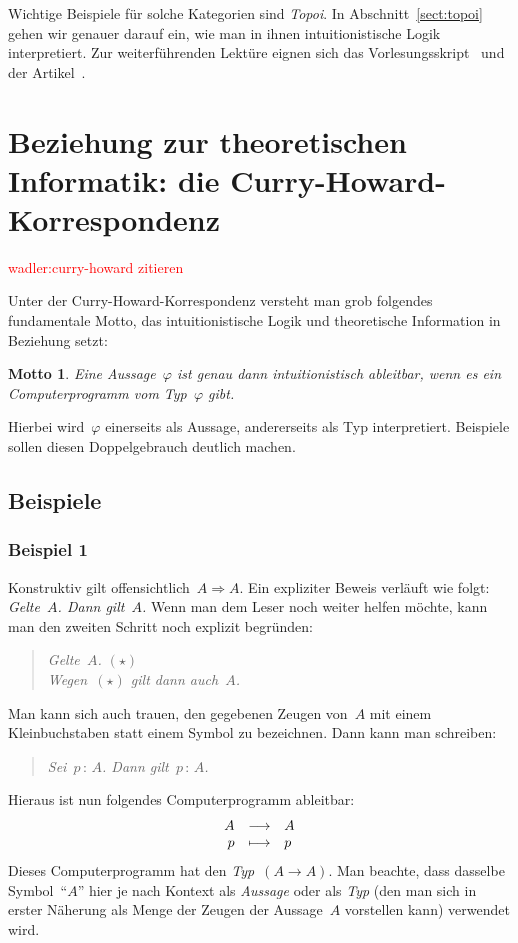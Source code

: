 \documentclass[a4paper,ngerman,12pt]{scrartcl}
\theoremstyle{definition}
\theoremstyle{plain}
\newtheorem{motto}[defn]{Motto}
\theoremstyle{remark}
\renewcommand{\_}{\mathpunct{.}\,}
\newcommand{\?}{\,{:}\,}
\newcommand{\XXX}[1]{\textcolor{red}{#1}}
\begin{document}
Wichtige Beispiele für solche Kategorien sind \emph{Topoi}. In
Abschnitt~\ref{sect:topoi} gehen wir genauer darauf ein, wie man in ihnen
intuitionistische Logik interpretiert.
Zur weiterführenden Lektüre eignen sich das
Vorlesungsskript~\cite{streicher:ctcl} und der Artikel~\cite{vickers:loctop}.


\section[Beziehung zur theoretischen Informatik: die
Curry-Howard-Korrespondenz]{Beziehung zur theoretischen Informatik: \newline die
Curry-Howard-Korrespondenz}

\XXX{wadler:curry-howard zitieren}

Unter der Curry-Howard-Korrespondenz versteht man grob folgendes fundamentale
Motto, das intuitionistische Logik und theoretische Information in Beziehung
setzt:

\begin{motto}Eine Aussage~$\varphi$ ist genau dann intuitionistisch ableitbar,
wenn es ein Computerprogramm vom Typ~$\varphi$ gibt.\end{motto}

Hierbei wird~$\varphi$ einerseits als Aussage, andererseits als Typ
interpretiert. Beispiele sollen diesen Doppelgebrauch deutlich machen.


\subsection{Beispiele}

\subsubsection*{Beispiel 1}

Konstruktiv gilt offensichtlich~$A \Rightarrow A$. Ein expliziter Beweis
verläuft wie folgt: \emph{Gelte~$A$. Dann gilt~$A$.} Wenn man dem Leser noch
weiter helfen möchte, kann man den zweiten Schritt noch explizit begründen:
\begin{quote}\emph{Gelte~$A$. $(\star)$ \\ Wegen~$(\star)$ gilt dann
auch~$A$.}\end{quote}
Man kann sich auch trauen, den gegebenen Zeugen von~$A$ mit einem
Kleinbuchstaben statt einem Symbol zu bezeichnen. Dann kann man schreiben:
\begin{quote}\emph{Sei~$p\?A$. Dann gilt~$p\?A$.}\end{quote}
Hieraus ist nun folgendes Computerprogramm ableitbar:
\[ \begin{array}{@{}rcl@{}}
  A &\longrightarrow& A \\
  p &\longmapsto& p
\end{array} \]
Dieses Computerprogramm hat den \emph{Typ}~$(A \to A)$. Man beachte, dass
dasselbe Symbol~"`$A$"' hier je nach Kontext als \emph{Aussage} oder als
\emph{Typ} (den man sich in erster Näherung als Menge der Zeugen der
Aussage~$A$ vorstellen kann) verwendet wird.
\end{document}
